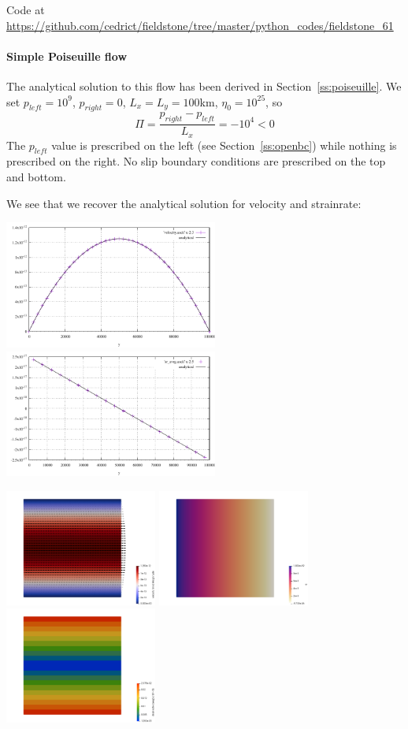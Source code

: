 Code at \url{https://github.com/cedrict/fieldstone/tree/master/python_codes/fieldstone_61}

\paragraph{Simple Poiseuille flow} The analytical solution to this flow has been derived 
in Section~\ref{ss:poiseuille}.
We set $p_{left}=10^9$, $p_{right}=0$, $L_x=L_y=100$km, $\eta_0=10^{25}$, so 
\[
\Pi=\frac{p_{right}-p_{left}}{L_x}=-10^4 <0
\]
The $p_{left}$ value is prescribed on the left (see Section~\ref{ss:openbc}) while 
nothing is prescribed on the right. No slip boundary conditions are 
prescribed on the top and bottom.

We see that we recover the analytical solution for velocity and strainrate:
\begin{center}
\includegraphics[width=7cm]{python_codes/fieldstone_61/results/poiseuille/velocity}
\includegraphics[width=7cm]{python_codes/fieldstone_61/results/poiseuille/exy}
\end{center}

\begin{center}
\includegraphics[width=5cm]{python_codes/fieldstone_61/results/poiseuille/vel}
\includegraphics[width=5cm]{python_codes/fieldstone_61/results/poiseuille/press}
\includegraphics[width=5cm]{python_codes/fieldstone_61/results/poiseuille/sr}
\end{center}




